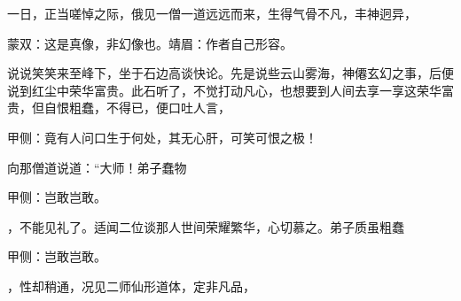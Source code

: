 \begin{parag}
    一日，正当嗟悼之际，俄见一僧一道远远而来，生得气骨不凡，丰神迥异，\begin{note}蒙双：这是真像，非幻像也。靖眉：作者自己形容。\end{note}说说笑笑来至峰下，坐于石边高谈快论。先是说些云山雾海，神僊玄幻之事，后便说到红尘中荣华富贵。此石听了，不觉打动凡心，也想要到人间去享一享这荣华富贵，但自恨粗蠢，不得已，便口吐人言，\begin{note}甲侧：竟有人问口生于何处，其无心肝，可笑可恨之极！\end{note}向那僧道说道：“大师！弟子蠢物\begin{note}甲侧：岂敢岂敢。\end{note}，不能见礼了。适闻二位谈那人世间荣耀繁华，心切慕之。弟子质虽粗蠢\begin{note}甲侧：岂敢岂敢。\end{note}，性却稍通，况见二师仙形道体，定非凡品，
\end{parag}
